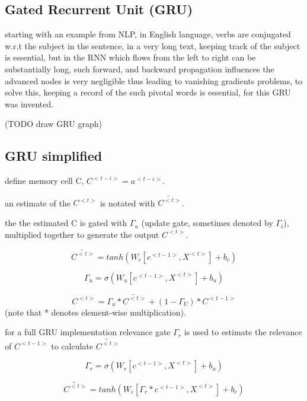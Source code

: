 \documentclass[4apaper,12pt]{book}
\begin{document}
\begin{description}
\begin{description}
      \subsection{Gated Recurrent Unit (GRU)}
      \begin{description}
      \item starting with an example from NLP, in English language, verbs are conjugated w.r.t the subject in the sentence, in a very long text, keeping track of the subject is essential, but in the RNN which flows from the left to right can be substantially long, such  forward, and backward propagation influences the advanced nodes is very negligible thus leading to vanishing gradients problems, to solve this, keeping a record of the such pivotal words is essential, for this GRU was invented.

      \item (TODO draw GRU graph)
        \subsection{GRU simplified}
        \begin{description}
        \item define memory cell C, $C^{<t-i>} = a^{<t-i>}$.
        \item an estimate of the $C^{<t>}$ is notated with  $\tilde{C^{<t>}}$.
        \item the the estimated C is gated with $\Gamma_u$ (update gate, sometimes denoted by $\Gamma_i$), multiplied together to generate the output $C^{<t>}$.
        \item $$\tilde{C^{<t>}}=tanh(W_c[c^{<t-1>},X^{<t>}]+b_c) $$
        \item $$ \Gamma_u = \sigma(W_u[c^{<t-1>},X^{<t>}]+b_u) $$
        \item $$ C^{<t>}=\Gamma_u * \tilde{C^{<t>}} + (1-\Gamma_U)*C^{<t-1>}$$ (note that * denotes element-wise multiplication).
        \end{description}
      \end{description}
    \item for a full GRU implementation relevance gate $\Gamma_r$ is used to estimate the relevance of $C^{<t-1>}$ to calculate $\tilde{C^{<t>}}$
    \item \item $$ \Gamma_r = \sigma(W_r[c^{<t-1>},X^{<t>}]+b_u) $$
    \item $$\tilde{C^{<t>}}=tanh(W_c[\Gamma_r*c^{<t-1>},X^{<t>}]+b_c) $$
    \end{description}

\end{description}
\end{document}
